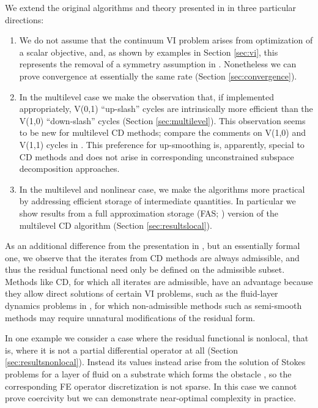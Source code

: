 \documentclass[letterpaper,final,12pt,reqno]{amsart}
\theoremstyle{cstyle}
\theoremstyle{dstyle}
\numberwithin{equation}{section}
\numberwithin{figure}{section}
\numberwithin{table}{section}
\numberwithin{theorem}{section}
\begin{document}
We extend the original algorithms and theory presented in \cite{Tai2003} in three particular directions:
\renewcommand{\labelenumi}{\emph{(\roman{enumi})}}
\begin{enumerate}
\item We do not assume that the continuum VI problem arises from optimization of a scalar objective, and, as shown by examples in Section \ref{sec:vi}, this represents the removal of a symmetry assumption in \cite{Tai2003}.  Nonetheless we can prove convergence at essentially the same rate (Section \ref{sec:convergence}). %
\item In the multilevel case we make the observation that, if implemented appropriately, V(0,1) ``up-slash'' cycles are intrinsically more efficient than the V(1,0) ``down-slash'' cycles (Section \ref{sec:multilevel}).  This observation seems to be new for multilevel CD methods; compare the comments on V(1,0) and V(1,1) cycles in \cite{GraeserKornhuber2009,Tai2003}.  This preference for up-smoothing is, apparently, special to CD methods and does not arise in corresponding unconstrained subspace decomposition \cite{Xu1992} approaches.
\item In the multilevel and nonlinear case, we make the algorithms more practical by addressing efficient storage of intermediate quantities.  In particular we show results from a full approximation storage (FAS; \cite{Brandt1977}) version of the multilevel CD algorithm (Section \ref{sec:resultslocal}).
\end{enumerate}

As an additional difference from the presentation in \cite{Tai2003}, but an essentially formal one, we observe that the iterates from CD methods are always admissible, and thus the residual functional need only be defined on the admissible subset.  Methods like CD, for which all iterates are admissible, have an advantage because they allow direct solutions of certain VI problems, such as the fluid-layer dynamics problems in \cite{Bueler2021conservation,JouvetBueler2012}, for which non-admissible methods such as semi-smooth methods \cite{BensonMunson2006} may require unnatural modifications of the residual form.

In one example we consider a case where the residual functional is nonlocal, that is, where it is not a partial differential operator at all (Section \ref{sec:resultsnonlocal}).  Instead its values instead arise from the solution of Stokes problems for a layer of fluid on a substrate which forms the obstacle \cite{SayagWorster2013}, so the corresponding FE operator discretization is not sparse.  In this case we cannot prove coercivity but we can demonstrate near-optimal complexity in practice.  %
\end{document}
